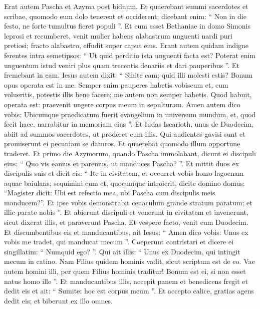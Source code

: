 \begin{biblechapter}
\begin{biblechapter}
\begin{biblechapter}
\begin{biblechapter}
\begin{biblechapter}
\begin{biblechapter}
\begin{biblechapter}
\begin{biblechapter}
\begin{biblechapter}
\begin{biblechapter}
\begin{biblechapter}
\begin{biblechapter}
\begin{biblechapter}
\begin{biblechapter}
\verse Erat autem Pascha et Azyma post biduum. Et quaerebant summi sacerdotes et scribae, quomodo eum dolo tenerent et occiderent; 
\verse dicebant enim: “ Non in die festo, ne forte tumultus fieret populi ”.
 \verse Et cum esset Bethaniae in domo Simonis leprosi et recumberet, venit mulier habens alabastrum unguenti nardi puri pretiosi; fracto alabastro, effudit super caput eius. 
\verse Erant autem quidam indigne ferentes intra semetipsos: “ Ut quid perditio ista unguenti facta est? 
\verse Poterat enim unguentum istud veniri plus quam trecentis denariis et dari pauperibus ”. Et fremebant in eam.
 \verse Iesus autem dixit: “ Sinite eam; quid illi molesti estis? Bonum opus operata est in me. 
\verse Semper enim pauperes habetis vobiscum et, cum volueritis, potestis illis bene facere; me autem non semper habetis. 
\verse Quod habuit, operata est: praevenit ungere corpus meum in sepulturam. 
\verse Amen autem dico vobis: Ubicumque praedicatum fuerit evangelium in universum mundum, et, quod fecit haec, narrabitur in memoriam eius ”.
 \verse Et Iudas Iscarioth, unus de Duodecim, abiit ad summos sacerdotes, ut proderet eum illis. 
\verse Qui audientes gavisi sunt et promiserunt ei pecuniam se daturos. Et quaerebat quomodo illum opportune traderet.
 \verse Et primo die Azymorum, quando Pascha immolabant, dicunt ei discipuli eius: “ Quo vis eamus et paremus, ut manduces Pascha? ”.
 \verse Et mittit duos ex discipulis suis et dicit eis: “ Ite in civitatem, et occurret vobis homo lagoenam aquae baiulans; sequimini eum 
\verse et, quocumque introierit, dicite domino domus: “Magister dicit: Ubi est refectio mea, ubi Pascha cum discipulis meis manducem?”. 
\verse Et ipse vobis demonstrabit cenaculum grande stratum paratum; et illic parate nobis ”. 
\verse Et abierunt discipuli et venerunt in civitatem et invenerunt, sicut dixerat illis, et paraverunt Pascha.
 \verse Et vespere facto, venit cum Duodecim. 
\verse Et discumbentibus eis et manducantibus, ait Iesus: “ Amen dico vobis: Unus ex vobis me tradet, qui manducat mecum ”. 
\verse Coeperunt contristari et dicere ei singillatim: “ Numquid ego? ”. 
\verse Qui ait illis: “ Unus ex Duodecim, qui intingit mecum in catino. 
\verse Nam Filius quidem hominis vadit, sicut scriptum est de eo. Vae autem homini illi, per quem Filius hominis traditur! Bonum est ei, si non esset natus homo ille ”.
 \verse Et manducantibus illis, accepit panem et benedicens fregit et dedit eis et ait: “ Sumite: hoc est corpus meum ”. 
\verse Et accepto calice, gratias agens dedit eis; et biberunt ex illo omnes. 

\end{biblechapter}
\end{biblechapter}
\end{biblechapter}
\end{biblechapter}
\end{biblechapter}
\end{biblechapter}
\end{biblechapter}
\end{biblechapter}
\end{biblechapter}
\end{biblechapter}
\end{biblechapter}
\end{biblechapter}
\end{biblechapter}
\end{biblechapter}
